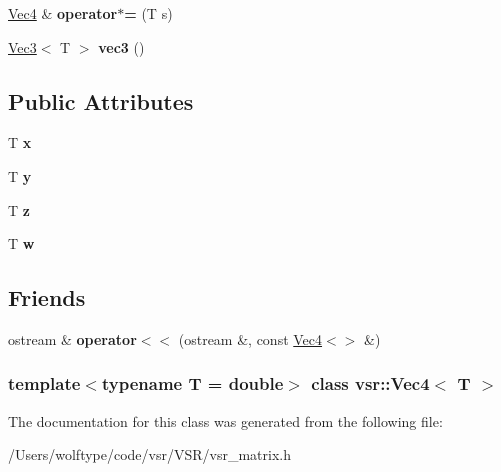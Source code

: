 \begin{DoxyCompactItemize}
\item 
\hypertarget{classvsr_1_1_vec4_a0046d865bcdf53607ce046cfe972f0b7}{\hyperlink{classvsr_1_1_vec4}{Vec4} \& {\bfseries operator$\ast$=} (T s)}\label{classvsr_1_1_vec4_a0046d865bcdf53607ce046cfe972f0b7}

\item 
\hypertarget{classvsr_1_1_vec4_afc3753ce827caf6a72fe548c29668efc}{\hyperlink{classvsr_1_1_vec3}{Vec3}$<$ T $>$ {\bfseries vec3} ()}\label{classvsr_1_1_vec4_afc3753ce827caf6a72fe548c29668efc}

\end{DoxyCompactItemize}
\subsection*{Public Attributes}
\begin{DoxyCompactItemize}
\item 
\hypertarget{classvsr_1_1_vec4_a12a96134b511e459174a923e4746ea42}{T {\bfseries x}}\label{classvsr_1_1_vec4_a12a96134b511e459174a923e4746ea42}

\item 
\hypertarget{classvsr_1_1_vec4_afa6a94ddec9e281fc0ae14df4b6d1647}{T {\bfseries y}}\label{classvsr_1_1_vec4_afa6a94ddec9e281fc0ae14df4b6d1647}

\item 
\hypertarget{classvsr_1_1_vec4_a89b62e3d8755ead40354b4671377cee6}{T {\bfseries z}}\label{classvsr_1_1_vec4_a89b62e3d8755ead40354b4671377cee6}

\item 
\hypertarget{classvsr_1_1_vec4_a174a06b566a91f723b91e555b6578cc9}{T {\bfseries w}}\label{classvsr_1_1_vec4_a174a06b566a91f723b91e555b6578cc9}

\end{DoxyCompactItemize}
\subsection*{Friends}
\begin{DoxyCompactItemize}
\item 
\hypertarget{classvsr_1_1_vec4_a8ebdd22b4c7d91fde8fa8df970349f1c}{ostream \& {\bfseries operator$<$$<$} (ostream \&, const \hyperlink{classvsr_1_1_vec4}{Vec4}$<$$>$ \&)}\label{classvsr_1_1_vec4_a8ebdd22b4c7d91fde8fa8df970349f1c}

\end{DoxyCompactItemize}
\subsubsection*{template$<$typename T = double$>$ class vsr\-::\-Vec4$<$ T $>$}



The documentation for this class was generated from the following file\-:\begin{DoxyCompactItemize}
\item 
/\-Users/wolftype/code/vsr/\-V\-S\-R/vsr\-\_\-matrix.\-h\end{DoxyCompactItemize}
